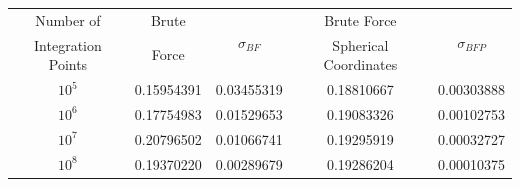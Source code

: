 \documentclass[10pt,a4paper,titlepage]{article}
\begin{document}
\begin{center}
\begin{tabular}{|c|c|c|c|c|}
\hline
Number of           &  Brute        & \multirow{2}{*}{$\sigma_{BF}$}&   Brute Force            &\multirow{2}{*}{$\sigma_{BFP}$} \\
Integration Points  &  Force        &                               &   Spherical Coordinates  &                                \\\hline
$10^5$              &  0.15954391   &   0.03455319                  &   0.18810667             &   0.00303888                   \\\hline
$10^6$              &  0.17754983   &   0.01529653                  &   0.19083326             &   0.00102753                   \\\hline
$10^7$              &  0.20796502   &   0.01066741                  &   0.19295919             &   0.00032727                   \\\hline
$10^8$              &  0.19370220   &   0.00289679                  &   0.19286204             &   0.00010375                   \\\hline
\end{tabular}
\end{center}
\end{document}

